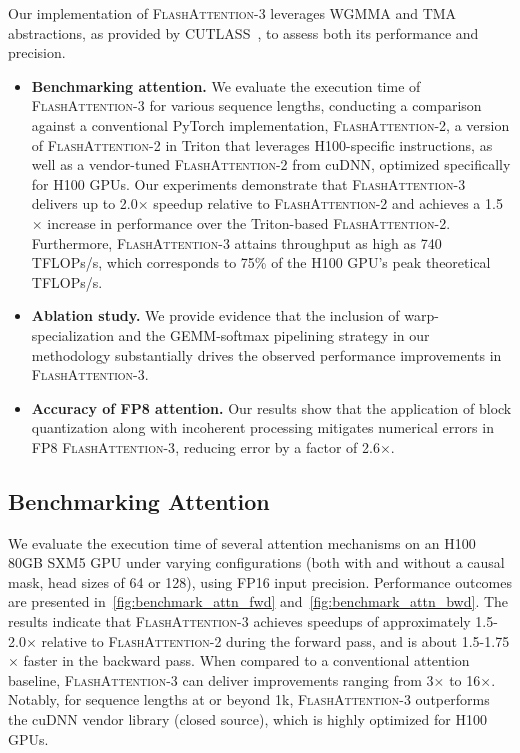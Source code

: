 Our implementation of \textsc{FlashAttention-3} leverages WGMMA and TMA abstractions, as provided by CUTLASS~\citep{Thakkar_CUTLASS_2023}, to assess both its performance and precision.

\begin{itemize}

\item \textbf{Benchmarking attention.} We evaluate the execution time of \textsc{FlashAttention-3} for various sequence lengths, conducting a comparison against a conventional PyTorch implementation, \textsc{FlashAttention-2}, a version of \textsc{FlashAttention-2} in Triton that leverages H100-specific instructions, as well as a vendor-tuned \textsc{FlashAttention-2} from cuDNN, optimized specifically for H100 GPUs. Our experiments demonstrate that \textsc{FlashAttention-3} delivers up to 2.0$\times$ speedup relative to \textsc{FlashAttention-2} and achieves a 1.5$\times$ increase in performance over the Triton-based \textsc{FlashAttention-2}. Furthermore, \textsc{FlashAttention-3} attains throughput as high as 740 TFLOPs/s, which corresponds to 75\% of the H100 GPU's peak theoretical TFLOPs/s.
\item \textbf{Ablation study.} We provide evidence that the inclusion of warp-specialization and the GEMM-softmax pipelining strategy in our methodology substantially drives the observed performance improvements in \textsc{FlashAttention-3}.
\item \textbf{Accuracy of FP8 attention.} Our results show that the application of block quantization along with incoherent processing mitigates numerical errors in FP8 \textsc{FlashAttention-3}, reducing error by a factor of 2.6$\times$.
\end{itemize}

\subsection{Benchmarking Attention}
\label{subsec:benchmark_attn}

We evaluate the execution time of several attention mechanisms on an H100 80GB SXM5 GPU under varying configurations (both with and without a causal mask, head sizes of 64 or 128), using FP16 input precision. Performance outcomes are presented in~\cref{fig:benchmark_attn_fwd} and~\cref{fig:benchmark_attn_bwd}. The results indicate that \textsc{FlashAttention-3} achieves speedups of approximately 1.5-2.0$\times$ relative to \textsc{FlashAttention-2} during the forward pass, and is about 1.5-1.75$\times$ faster in the backward pass. When compared to a conventional attention baseline, \textsc{FlashAttention-3} can deliver improvements ranging from 3$\times$ to 16$\times$. Notably, for sequence lengths at or beyond 1k, \textsc{FlashAttention-3} outperforms the cuDNN vendor library (closed source), which is highly optimized for H100 GPUs.

